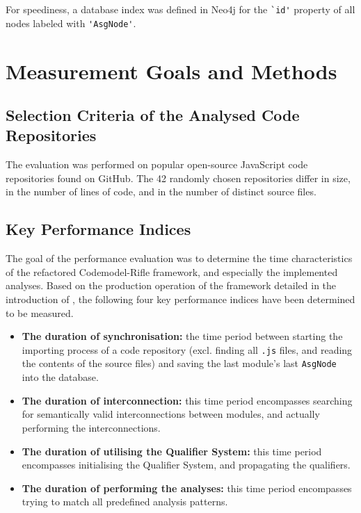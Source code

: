For speediness, a database index was defined in Neo4j for the \lstinline{`id'} property of all nodes labeled with \lstinline{'AsgNode'}.


\section{Measurement Goals and Methods}

\subsection{Selection Criteria of the Analysed Code Repositories}

The evaluation was performed on popular open-source JavaScript code repositories found on GitHub. The 42 randomly chosen repositories differ in size, in the number of lines of code, and in the number of distinct source files.


\subsection{Key Performance Indices}

The goal of the performance evaluation was to determine the time characteristics of the refactored Codemodel-Rifle framework, and especially the implemented analyses. Based on the production operation of the framework detailed in the introduction of , the following four key performance indices have been determined to be measured.

\begin{itemize}
\item \textbf{The duration of synchronisation:} the time period between starting the importing process of a code repository (excl. finding all \lstinline{.js} files, and reading the contents of the source files) and saving the last module's last \lstinline{AsgNode} into the database.
\item \textbf{The duration of interconnection:} this time period encompasses searching for semantically valid interconnections between modules, and actually performing the interconnections.
\item \textbf{The duration of utilising the Qualifier System:} this time period encompasses initialising the Qualifier System, and propagating the qualifiers.
\item \textbf{The duration of performing the analyses:} this time period encompasses trying to match all predefined analysis patterns.
\end{itemize}

